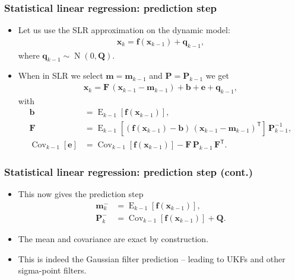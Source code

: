 \documentclass[first=dgreen,second=purple,presentation]{elecslides}
\newcommand{\mbf}[1]{\mathbf{#1}}
\newcommand{\T}[0]{\mathsf{T}}
\DeclareMathOperator{\Cov}{Cov}
\DeclareMathOperator{\E}{E}
\DeclareMathOperator{\N}{N}
\newcommand{\vb}{\mbf{b}}
\newcommand{\ve}{\mbf{e}}
\newcommand{\vf}{\mbf{f}}
\newcommand{\vm}{\mbf{m}}
\newcommand{\vq}{\mbf{q}}
\newcommand{\vx}{\mbf{x}}
\newcommand{\MF}{\mbf{F}}
\newcommand{\MP}{\mbf{P}}
\newcommand{\MQ}{\mbf{Q}}
\begin{document}
\begin{frame}
 \frametitle{Statistical linear regression: prediction step}

\begin{itemize}[<+->]
\item Let us use the SLR approximation on the \alert{dynamic model}:
%
\begin{equation}
\begin{split}
  \vx_{k} = \vf(\vx_{k-1}) + \vq_{k-1},
\end{split}
\nonumber
\end{equation}
%
where $\vq_{k-1} \sim \N(0,\MQ)$. 

\item When in SLR we \alert{select $\vm = \vm_{k-1}$ and $\MP = \MP_{k-1}$} we get
%
\begin{equation}
\begin{split}
  \vx_{k} = \MF \, (\vx_{k-1} - \vm_{k-1}) + \vb + \ve + \vq_{k-1},
\end{split}
\nonumber
\end{equation}
%
with
%
\begin{equation}
\begin{split}
  \vb &= \E_{k-1}\left[ \vf(\vx_{k-1}) \right], \\
  \MF &= \E_{k-1}\left[ (\vf(\vx_{k-1}) - \vb) \, (\vx_{k-1} - \vm_{k-1})^\T \right] \, \MP_{k-1}^{-1}, \\
  \Cov_{k-1}[\ve] &= \Cov_{k-1}\left[ \vf(\vx_{k-1}) \right] - \MF \, \MP_{k-1} \, \MF^\T.
\end{split}
\nonumber
\end{equation}
\end{itemize}
\end{frame}

\begin{frame}
 \frametitle{Statistical linear regression: prediction step (cont.)}

\begin{itemize}[<+->]
\item This now gives the \alert{prediction step}
%
\begin{equation}
\begin{split}
  \vm_k^- &= \E_{k-1}[ \vf(\vx_{k-1}) ], \\
  \MP_k^- &= \Cov_{k-1}[ \vf(\vx_{k-1}) ] + \MQ.
\end{split}
\nonumber
\end{equation}

\item The \alert{mean and covariance are exact} by construction.

\item This is indeed the \alert{Gaussian filter prediction} -- leading to UKFs and other sigma-point filters.
\end{itemize}
\end{frame}
\end{document}
